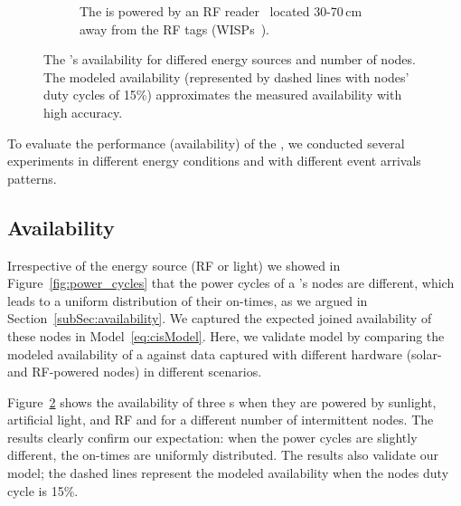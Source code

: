 \begin{figure}[h]
\begin{subfigure}{.66\columnwidth}
                \caption{The \cis is powered by an RF reader~\cite{r420_website} located 30-70\,cm away from the RF tags (WISPs~\cite{smith2006wirelessly}).}
            \label{fig:rfPwrCIS}
        \end{subfigure}
        \caption{The \fullcis's availability for differed energy sources and number of nodes. 
        The modeled availability (represented by dashed lines with nodes' duty cycles of 15\%) approximates the measured availability with high accuracy.}
        \label{fig:pwrCIS}
\end{figure} 
To evaluate the performance (availability) of the \fullcis, we conducted several experiments in different energy conditions and with different event arrivals patterns. 
%
\subsection{Availability}
Irrespective of the energy source (RF or light) we showed in Figure~\ref{fig:power_cycles} that the power cycles of a \cis's nodes are different, which leads to a uniform distribution of their on-times, as we argued in Section~\ref{subSec:availability}. We captured the expected joined availability of these nodes in Model~\ref{eq:cisModel}.  Here, we validate model by comparing the modeled availability of a \cis against data captured with different hardware (solar- and RF-powered nodes) in different scenarios.
 
Figure~\ref{fig:pwrCIS} shows the availability of three \cis{}s when they are powered by sunlight, artificial light, and RF and for a different number of intermittent nodes.
The results clearly confirm our expectation: when the power cycles are slightly different, the on-times are uniformly distributed. The results also validate our model; the dashed lines represent the modeled availability when the nodes duty cycle is 15\%.

